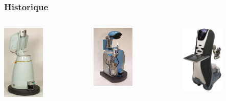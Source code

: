 \begin{frame}
	\frametitle{Historique}
	\begin{columns}[T]
		\begin{column}{.25\textwidth}
			\includegraphics[width=2cm]{./image/Care_o_bot_1.jpg}
		\end{column}
   		\begin{column}{.25\textwidth}
			\includegraphics[width=2cm]{./image/Care_o_bot_2.jpg}
   		\end{column}
		\begin{column}{.25\textwidth}
			\includegraphics[width=2cm]{./image/Care_o_bot_3.jpg}
   		\end{column}
	\end{columns}
\end{frame}

